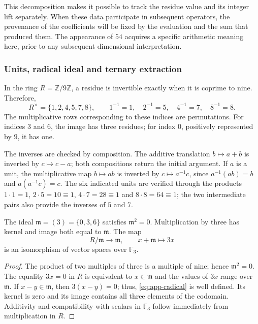This decomposition makes it possible to track the residue value and its integer lift separately. When these data participate in subsequent operators, the provenance of the coefficients will be fixed by the evaluation and the sum that produced them. The appearance of $54$ acquires a specific arithmetic meaning here, prior to any subsequent dimensional interpretation.

\subsubsection{Units, radical ideal and ternary extraction}

In the ring $R=\mathbb Z/9\mathbb Z$, a residue is invertible exactly when it is coprime to nine. Therefore,
\[
 R^\times=\{1,2,4,5,7,8\},
 \qquad 1^{-1}=1,\quad2^{-1}=5,\quad4^{-1}=7,\quad8^{-1}=8.
\]
The multiplicative rows corresponding to these indices are permutations. For indices $3$ and $6$, the image has three residues; for index $0$, positively represented by $9$, it has one.

The inverses are checked by composition. The additive translation $b\mapsto a+b$ is inverted by $c\mapsto c-a$; both compositions return the initial argument. If $a$ is a unit, the multiplicative map $b\mapsto ab$ is inverted by $c\mapsto a^{-1}c$, since $a^{-1}(ab)=b$ and $a(a^{-1}c)=c$. The six indicated units are verified through the products $1\cdot1=1$, $2\cdot5=10\equiv1$, $4\cdot7=28\equiv1$ and $8\cdot8=64\equiv1$; the two intermediate pairs also provide the inverses of $5$ and $7$.

\begin{bloqueindivisible}
\begin{proposicion}
\label{prop:app-radical}
The ideal $\mathfrak m=(3)=\{0,3,6\}$ satisfies $\mathfrak m^2=0$. Multiplication by three has kernel and image both equal to $\mathfrak m$. The map
\begin{equation}
 R/\mathfrak m\longrightarrow\mathfrak m,
 \qquad x+\mathfrak m\longmapsto3x
 \label{eq:app-radical}
\end{equation}
is an isomorphism of vector spaces over $\mathbb F_3$.
\end{proposicion}

\begin{proof}
The product of two multiples of three is a multiple of nine; hence $\mathfrak m^2=0$. The equality $3x=0$ in $R$ is equivalent to $x\in\mathfrak m$ and the values of $3x$ range over $\mathfrak m$. If $x-y\in\mathfrak m$, then $3(x-y)=0$; thus, \eqref{eq:app-radical} is well defined. Its kernel is zero and its image contains all three elements of the codomain. Additivity and compatibility with scalars in $\mathbb F_3$ follow immediately from multiplication in $R$.
\end{proof}
\end{bloqueindivisible}

